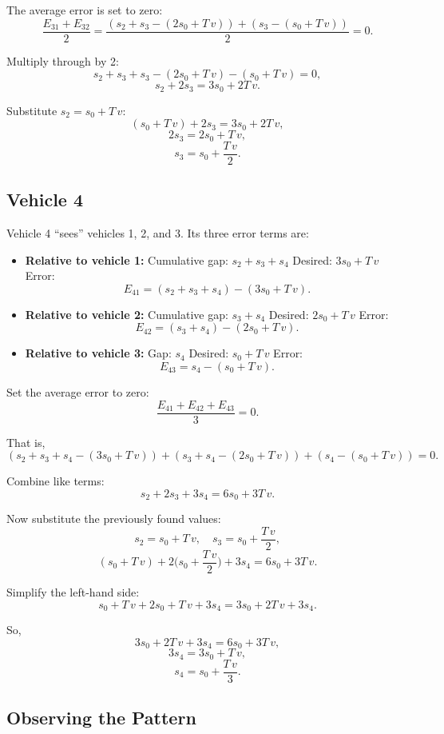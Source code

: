 \documentclass{article}
\begin{document}
The average error is set to zero:
\[
\frac{E_{31} + E_{32}}{2} = \frac{(s_2+s_3 - (2s_0+T\,v)) + (s_3 - (s_0+T\,v))}{2} = 0.
\]

Multiply through by 2:
\[
s_2 + s_3 + s_3 - (2s_0+T\,v) - (s_0+T\,v) = 0,
\]
\[
s_2 + 2 s_3 = 3s_0 + 2T\,v.
\]

Substitute \( s_2 = s_0+T\,v \):
\[
(s_0+T\,v) + 2 s_3 = 3s_0+2T\,v,
\]
\[
2s_3 = 2s_0 + T\,v,
\]
\[
s_3 = s_0 + \frac{T\,v}{2}.
\]

\subsection*{Vehicle 4}

Vehicle 4 ``sees'' vehicles 1, 2, and 3. Its three error terms are:
\begin{itemize}
    \item \textbf{Relative to vehicle 1:}  
    Cumulative gap: \( s_2+s_3+s_4 \)  
    Desired: \( 3s_0+T\,v \)  
    Error:  
    \[
    E_{41} = (s_2+s_3+s_4) - (3s_0+T\,v).
    \]
    \item \textbf{Relative to vehicle 2:}  
    Cumulative gap: \( s_3+s_4 \)  
    Desired: \( 2s_0+T\,v \)  
    Error:
    \[
    E_{42} = (s_3+s_4) - (2s_0+T\,v).
    \]
    \item \textbf{Relative to vehicle 3:}  
    Gap: \( s_4 \)  
    Desired: \( s_0+T\,v \)  
    Error:
    \[
    E_{43} = s_4 - (s_0+T\,v).
    \]
\end{itemize}

Set the average error to zero:
\[
\frac{E_{41}+E_{42}+E_{43}}{3} = 0.
\]

That is,
\[
(s_2+s_3+s_4 - (3s_0+T\,v)) + (s_3+s_4 - (2s_0+T\,v)) + (s_4 - (s_0+T\,v)) = 0.
\]

Combine like terms:
\[
s_2 + 2 s_3 + 3 s_4 = 6s_0 + 3T\,v.
\]

Now substitute the previously found values:
\[
s_2 = s_0+T\,v, \quad s_3 = s_0+\frac{T\,v}{2},
\]
\[
(s_0+T\,v) + 2\Big(s_0+\frac{T\,v}{2}\Big) + 3 s_4 = 6s_0+3T\,v.
\]

Simplify the left-hand side:
\[
s_0+T\,v + 2s_0+T\,v + 3s_4 = 3s_0 + 2T\,v + 3s_4.
\]

So,
\[
3s_0 + 2T\,v + 3s_4 = 6s_0 + 3T\,v,
\]
\[
3s_4 = 3s_0 + T\,v,
\]
\[
s_4 = s_0 + \frac{T\,v}{3}.
\]

\subsection*{Observing the Pattern}
\end{document}
